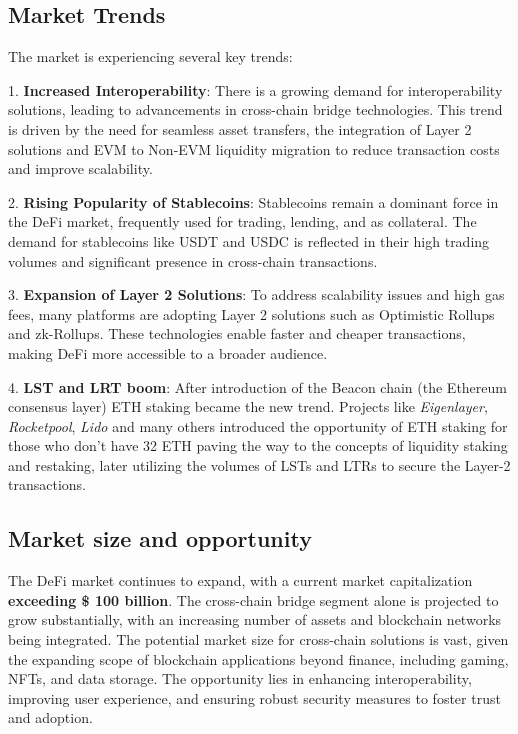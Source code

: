 \documentclass[12pt, a4paper]{article}
\begin{document}
\subsection{Market Trends}

The market is experiencing several key trends:

1. \textbf{Increased Interoperability}: There is a growing demand for interoperability solutions, leading to advancements in cross-chain bridge technologies. This trend is driven by the need for seamless asset transfers, the integration of Layer 2 solutions and EVM to Non-EVM liquidity migration to reduce transaction costs and improve scalability.

2. \textbf{Rising Popularity of Stablecoins}: Stablecoins remain a dominant force in the DeFi market, frequently used for trading, lending, and as collateral. The demand for stablecoins like USDT and USDC is reflected in their high trading volumes and significant presence in cross-chain transactions.

3. \textbf{Expansion of Layer 2 Solutions}: To address scalability issues and high gas fees, many platforms are adopting Layer 2 solutions such as Optimistic Rollups and zk-Rollups. These technologies enable faster and cheaper transactions, making DeFi more accessible to a broader audience.

4. \textbf{LST and LRT boom}: After introduction of the Beacon chain (the Ethereum consensus layer) ETH staking became the new trend. Projects like \textit{Eigenlayer}, \textit{Rocketpool}, \textit{Lido} and many others introduced the opportunity of ETH staking for those who don't have 32 ETH paving the way to the concepts of liquidity staking and restaking, later utilizing the volumes of LSTs and LTRs to secure the Layer-2 transactions.

\subsection{Market size and opportunity}

The DeFi market continues to expand, with a current market capitalization \textbf{exceeding \$ 100 billion}. The cross-chain bridge segment alone is projected to grow substantially, with an increasing number of assets and blockchain networks being integrated. The potential market size for cross-chain solutions is vast, given the expanding scope of blockchain applications beyond finance, including gaming, NFTs, and data storage. The opportunity lies in enhancing interoperability, improving user experience, and ensuring robust security measures to foster trust and adoption.
\end{document}
